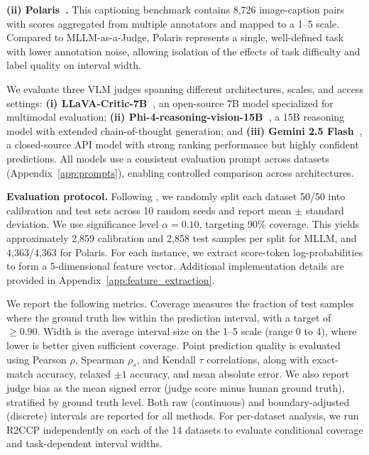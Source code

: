 \documentclass{article}
\begin{document}
\textbf{(ii) Polaris~\citep{wada2024polos}.}
This captioning benchmark contains 8,726 image-caption pairs with scores aggregated from multiple annotators and mapped to a 1--5 scale. Compared to MLLM-as-a-Judge, Polaris represents a single, well-defined task with lower annotation noise, allowing isolation of the effects of task difficulty and label quality on interval width.

We evaluate three VLM judges spanning different architectures, scales, and access settings: \textbf{(i) LLaVA-Critic-7B~\citep{xiong2024llavacritic}}, an open-source 7B model specialized for multimodal evaluation; \textbf{(ii) Phi-4-reasoning-vision-15B~\citep{abdin2025phi4reasoning}}, a 15B reasoning model with extended chain-of-thought generation; and \textbf{(iii) Gemini 2.5 Flash~\citep{google2025gemini25}}, a closed-source API model with strong ranking performance but highly confident predictions. All models use a consistent evaluation prompt across datasets (Appendix~\ref{app:prompts}), enabling controlled comparison across architectures.

\textbf{Evaluation protocol.}
Following \citet{sheng2025analyzing}, we randomly split each dataset 50/50 into calibration and test sets across 10 random seeds and report mean $\pm$ standard deviation. We use significance level $\alpha = 0.10$, targeting 90\% coverage. This yields approximately 2,859 calibration and 2,858 test samples per split for MLLM, and 4,363/4,363 for Polaris. For each instance, we extract score-token log-probabilities to form a 5-dimensional feature vector. Additional implementation details are provided in Appendix~\ref{app:feature_extraction}.

We report the following metrics. Coverage measures the fraction of test samples where the ground truth lies within the prediction interval, with a target of $\geq 0.90$. Width is the average interval size on the 1--5 scale (range 0 to 4), where lower is better given sufficient coverage. Point prediction quality is evaluated using Pearson $\rho$, Spearman $\rho_s$, and Kendall $\tau$ correlations, along with exact-match accuracy, relaxed $\pm 1$ accuracy, and mean absolute error. We also report judge bias as the mean signed error (judge score minus human ground truth), stratified by ground truth level. Both raw (continuous) and boundary-adjusted (discrete) intervals are reported for all methods. For per-dataset analysis, we run R2CCP independently on each of the 14 datasets to evaluate conditional coverage and task-dependent interval widths.
\end{document}
